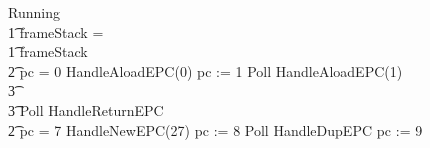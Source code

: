 \begin{figure}[t!]
  \setlength{\zedindent}{0cm}
  \setlength{\zedtab}{0.5cm}
  \setlength{\zedleftsep}{0.1cm}
  \begin{circus}
    Running \circdef \\
    \t1 \circif frameStack = \emptyset \circthen \Skip \\
    \t1 {} \circelse frameStack \neq \emptyset \circthen {} \\
    \t2 \circif pc = 0 \circthen HandleAloadEPC(0) \circseq pc := 1 \circseq Poll \circseq HandleAloadEPC(1) \circseq \\
    \t3 {} \cdots {} \\
    \t3 Poll \circseq HandleReturnEPC \\
    \t2 {} \circelse pc = 7 \circthen HandleNewEPC(27) \circseq pc := 8 \circseq Poll \circseq HandleDupEPC \circseq pc := 9 \circseq \\

\end{circus}
\end{figure}

